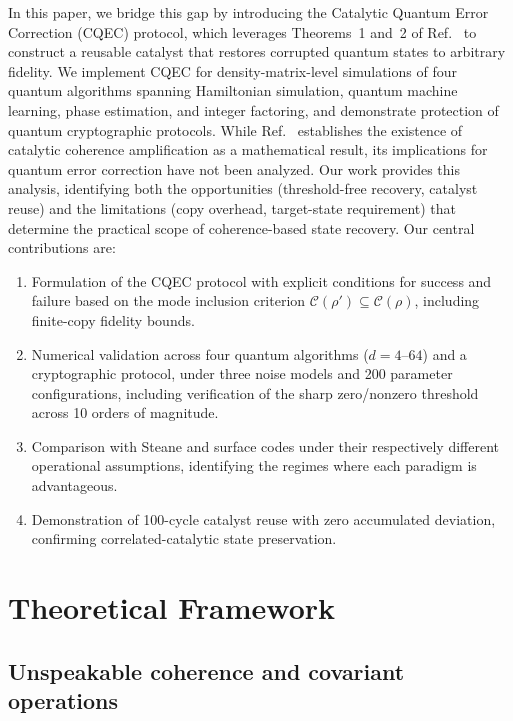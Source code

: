 \documentclass[prx,twocolumn,superscriptaddress,longbibliography,floatfix]{revtex4-2}
\begin{document}
In this paper, we bridge this gap by introducing the Catalytic Quantum Error Correction (CQEC) protocol, which leverages Theorems~1 and~2 of Ref.~\cite{Shiraishi2024} to construct a reusable catalyst that restores corrupted quantum states to arbitrary fidelity.
We implement CQEC for density-matrix-level simulations of four quantum algorithms spanning Hamiltonian simulation, quantum machine learning, phase estimation, and integer factoring, and demonstrate protection of quantum cryptographic protocols.
While Ref.~\cite{Shiraishi2024} establishes the existence of catalytic coherence amplification as a mathematical result, its implications for quantum error correction have not been analyzed.
Our work provides this analysis, identifying both the opportunities (threshold-free recovery, catalyst reuse) and the limitations (copy overhead, target-state requirement) that determine the practical scope of coherence-based state recovery.
Our central contributions are:
\begin{enumerate}
\item Formulation of the CQEC protocol with explicit conditions for success and failure based on the mode inclusion criterion $\mathcal{C}(\rho') \subseteq \mathcal{C}(\rho)$, including finite-copy fidelity bounds.
\item Numerical validation across four quantum algorithms ($d = 4$--$64$) and a cryptographic protocol, under three noise models and 200 parameter configurations, including verification of the sharp zero/nonzero threshold across 10 orders of magnitude.
\item Comparison with Steane and surface codes under their respectively different operational assumptions, identifying the regimes where each paradigm is advantageous.
\item Demonstration of 100-cycle catalyst reuse with zero accumulated deviation, confirming correlated-catalytic state preservation.
\end{enumerate}


\section{Theoretical Framework}
\label{sec:theory}

\subsection{Unspeakable coherence and covariant operations}
\label{sec:covariant}
\end{document}
